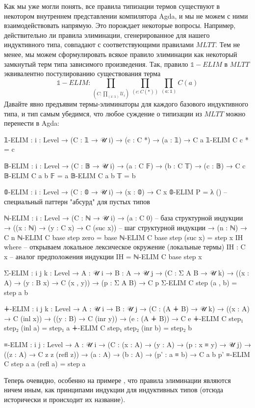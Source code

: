 \documentclass{article}[12pt]
\begin{document}
Как мы уже могли понять, все правила типизации термов существуют в некотором внутреннем представлении компилятора
Agda, и мы не можем с ними взаимодействовать напрямую. Это порождает некоторые вопросы. Например,
действительно ли правила элиминации, сгенерированное для нашего индуктивного типа, совпадают с соответствующими
правилами $MLTT$. Тем не менее, мы можем сформулировать всякое правило элиминации как некоторый замкнутый
терм типа зависимого произведения. Так, правило $\mathbb 1-ELIM$ в $MLTT$ эквивалентно
постулированию существования терма 
$$\mathbb 1-ELIM : \prod_{(C : \prod_{(x : \mathbb 1)} \mathcal U_i)} \prod_{(c : C(*))} \prod_{(a : \mathbb 1)} C(a)$$
Давайте явно предъявим термы-элиминаторы для каждого базового индуктивного типа, и тип самым
убедимся, что любое суждение о типизации из $MLTT$ можно перенести в Agda:
\begin{code}
𝟙-ELIM : {i : Level} → (C : 𝟙 → 𝒰 i) → (c : C *) → (a : 𝟙) → C a
𝟙-ELIM C c * = c

𝔹-ELIM : {i : Level} → (C : 𝔹 → 𝒰 i) 
         → (a : C 𝔽) 
         → (b : C 𝕋) 
         → (c : 𝔹) → C c
𝔹-ELIM C a b 𝔽 = a
𝔹-ELIM C a b 𝕋 = b

𝟘-ELIM : {i : Level} → (C : 𝟘 → 𝒰 i) → (x : 𝟘) → C x
𝟘-ELIM P = λ () -- специальный паттерн "абсурд" для пустых типов

ℕ-ELIM : {i : Level} → (C : ℕ → 𝒰 i)
         → (a : C 0) -- база структурной индукции
         → ((x : ℕ) → (y : C x) → C (suc x)) -- шаг структурной индукции
         → (n : ℕ) → C n
ℕ-ELIM C base step zero = base
ℕ-ELIM C base step (suc x) = step x IH
    where -- открываем локальное лексическое окружение (локальные термы)
        IH : C x -- аналог предположения индукции
        IH = ℕ-ELIM C base step x

Σ-ELIM : {i j k : Level} → {A : 𝒰 i} → {B : A → 𝒰 j}
         → (C : Σ A B → 𝒰 k)
         → ((x : A) → (y : B x) → C (x , y))
         → (p : Σ A B) → C p
Σ-ELIM C step (a , b) = step a b

∔-ELIM : {i j k : Level} → {A : 𝒰 i} → {B : 𝒰 j}
         → (C : (A ∔ B) → 𝒰 k)
         → ((x : A) → C (inl x))
         → ((y : B) → C (inr y))
         → (e : (A ∔ B)) → C e
∔-ELIM C step₁ step₂ (inl a) = step₁ a
∔-ELIM C step₁ step₂ (inr b) = step₂ b

≡-ELIM : {i j : Level} → {A : 𝒰 i}
         → (C : (x : A) → (y : A) → (p : x ≡ y) → 𝒰 j)
         → ((z : A) → C z z (refl z))
         → (a : A) → (b : A) → (p' : a ≡ b)
         → C a b p'
≡-ELIM C step a a (refl a) = step a
\end{code}
Теперь очевидно, особенно на примере , что правила элиминации являются
ничем иным, как принципами индукции для индуктивных типов (отсюда исторически и происходит их название).
\end{document}

